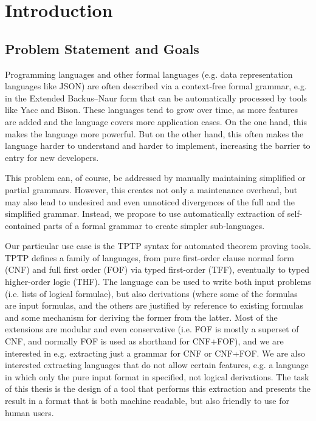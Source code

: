 
\chapter{Introduction}\label{cha:Introduction}

\section{Problem Statement and Goals}\label{sec:Aufgabenstellung}
Programming languages and other formal languages (e.g. data representation languages like JSON) are often described via a context-free formal grammar, e.g. in the Extended Backus–Naur form that can be automatically processed by tools like Yacc and Bison. These languages tend to grow over time, as more features are added and the language covers more application cases. On the one hand, this makes the language more powerful. But on the other hand, this often makes the language harder to understand and harder to implement, increasing the barrier to entry for new developers.

This problem can, of course, be addressed by manually maintaining simplified or partial grammars. However, this creates not only a maintenance overhead, but may also lead to undesired and even unnoticed divergences of the full and the simplified grammar. Instead, we propose to use automatically extraction of self-contained parts of a formal grammar to create simpler sub-languages.

Our particular use case is the TPTP syntax for automated theorem proving tools. TPTP defines a family of languages, from pure first-order clause normal form (CNF) and full first order (FOF) via typed first-order (TFF), eventually to typed higher-order logic (THF). The language can be used to write both input problems (i.e. lists of logical formulae), but also derivations (where some of the formulas are input formulas, and the others are justified by reference to existing formulas and some mechanism for deriving the former from the latter. Most of the extensions are modular and even conservative (i.e. FOF is mostly a superset of CNF, and normally FOF is used as shorthand for CNF+FOF), and we are interested in e.g. extracting just a grammar for CNF or CNF+FOF. We are also interested extracting languages that do not allow certain features, e.g. a language in which only the pure input format in specified, not logical derivations. The task of this thesis is the design of a tool that performs this extraction and presents the result in a format that is both machine readable, but also friendly to use for human users.

